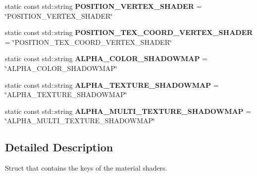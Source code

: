 \begin{DoxyCompactItemize}
\mbox{\label{struct_geometry_engine_1_1_geometry_material_1_1_material_constants_a5eccc9d5e9fedc572cae9b2750ba6929}} 
static const std\+::string {\bfseries P\+O\+S\+I\+T\+I\+O\+N\+\_\+\+V\+E\+R\+T\+E\+X\+\_\+\+S\+H\+A\+D\+ER} = \char`\"{}P\+O\+S\+I\+T\+I\+O\+N\+\_\+\+V\+E\+R\+T\+E\+X\+\_\+\+S\+H\+A\+D\+ER\char`\"{}
\item 
\mbox{\label{struct_geometry_engine_1_1_geometry_material_1_1_material_constants_a806e4e725a483703b5e38ef0ee9a292a}} 
static const std\+::string {\bfseries P\+O\+S\+I\+T\+I\+O\+N\+\_\+\+T\+E\+X\+\_\+\+C\+O\+O\+R\+D\+\_\+\+V\+E\+R\+T\+E\+X\+\_\+\+S\+H\+A\+D\+ER} = \char`\"{}P\+O\+S\+I\+T\+I\+O\+N\+\_\+\+T\+E\+X\+\_\+\+C\+O\+O\+R\+D\+\_\+\+V\+E\+R\+T\+E\+X\+\_\+\+S\+H\+A\+D\+ER\char`\"{}
\item 
\mbox{\label{struct_geometry_engine_1_1_geometry_material_1_1_material_constants_a0e93a30e85e8ab11ed7fefccb2b3955a}} 
static const std\+::string {\bfseries A\+L\+P\+H\+A\+\_\+\+C\+O\+L\+O\+R\+\_\+\+S\+H\+A\+D\+O\+W\+M\+AP} = \char`\"{}A\+L\+P\+H\+A\+\_\+\+C\+O\+L\+O\+R\+\_\+\+S\+H\+A\+D\+O\+W\+M\+AP\char`\"{}
\item 
\mbox{\label{struct_geometry_engine_1_1_geometry_material_1_1_material_constants_aab7778fa45b8fffcf507af94e5577d53}} 
static const std\+::string {\bfseries A\+L\+P\+H\+A\+\_\+\+T\+E\+X\+T\+U\+R\+E\+\_\+\+S\+H\+A\+D\+O\+W\+M\+AP} = \char`\"{}A\+L\+P\+H\+A\+\_\+\+T\+E\+X\+T\+U\+R\+E\+\_\+\+S\+H\+A\+D\+O\+W\+M\+AP\char`\"{}
\item 
\mbox{\label{struct_geometry_engine_1_1_geometry_material_1_1_material_constants_a400c73839d56b2c8226671abd920d963}} 
static const std\+::string {\bfseries A\+L\+P\+H\+A\+\_\+\+M\+U\+L\+T\+I\+\_\+\+T\+E\+X\+T\+U\+R\+E\+\_\+\+S\+H\+A\+D\+O\+W\+M\+AP} = \char`\"{}A\+L\+P\+H\+A\+\_\+\+M\+U\+L\+T\+I\+\_\+\+T\+E\+X\+T\+U\+R\+E\+\_\+\+S\+H\+A\+D\+O\+W\+M\+AP\char`\"{}
\end{DoxyCompactItemize}


\subsection{Detailed Description}
Struct that contains the keys of the material shaders. 

